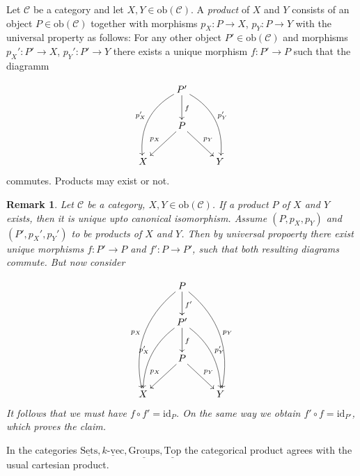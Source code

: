 \documentclass[11pt]{book}
\numberwithin{dummy}{section}
\newtheorem{remark}[theorem]{Remark}
\theoremstyle{nonumberbreak}
\newenvironment{defin}[1][]{\ifthenelse{\equal{#1}{}}{\definition}{\definition[#1]}\rm}{\enddefinition}
\newenvironment{pr}[1][]{\ifthenelse{\equal{#1}{}}{\proof}{\proof[#1]}\rm}{\endproof}
\newenvironment{ex}[1][]{\ifthenelse{\equal{#1}{}}{\example}{\example[#1]}\rm}{\endexample}
\newcommand{\sets}{\underline{\mathrm{Sets}}}
\newcommand{\kvec}{\underline{k\textrm{-}\mathrm{vec}}}
\newcommand{\grp}{\underline{\mathrm{Groups}}}
\newcommand{\topsp}{\underline{\mathrm{Top}}}
\newcommand{\C}{\mathcal{C}}
\newcommand{\obc}{\mathrm{ob}(\mathcal{C})}
\newcommand{\la}{\longrightarrow}
\newcommand{\id}{\mathrm{id}}
\begin{document}
\begin{spacing}{1.4}
\begin{defin}    %

Let $\C$ be a category and let $X,Y \in \obc$. A \textit{product} of $X$ and $Y$ consists of an object $P \in \obc$ together with morphisms $p_X: P \la X$, $p_Y: P \la Y$ with the universal property as follows: For any other object $P' \in \obc$ and morphisms $p_X': P' \la X$, $p_Y': P' \la Y$ there exists a unique morphism $f: P' \la P$ such that the diagramm

$$
\begin{xy}
\xymatrix{
& P' \ar[d]^{f} \ar@/_{16.0pt}/[ldd]_{p_X'} \ar@/^{16pt}/[rdd]^{p_Y'} & \\ & P \ar[ld]_{p_X} \ar[rd]^{p_Y} & \\ X && Y
}
\end{xy}
$$
commutes. Products may exist or not.

\begin{remark}
Let $\C$ be a category, $X,Y \in \obc$. If a product $P$ of $X$ and $Y$ exists, then it is unique upto canonical isomorphism.
\begin{pr}
Assume $(P,p_X, p_Y)$ and $(P', p_X', p_Y')$ to be products of $X$ and $Y$. Then by universal propoerty there exist unique morphisms $f: P' \la P$ and $f': P \la P'$, such that both resulting diagrams commute. But now consider

$$
\begin{xy}
\xymatrix{
& P \ar[d]^{f'} \ar@/_{20.0pt}/[lddd]_{p_X} \ar@/^{20pt}/[rddd]^{p_Y} & \\ & P' \ar[d]^{f} \ar@/_{12.0pt}/[ldd]_{p_X'} \ar@/^{12pt}/[rdd]^{p_Y'} & \\ & P \ar[ld]_{p_X} \ar[rd]^{p_Y} & \\ X && Y
}
\end{xy}
$$
It follows that we must have $f \circ f' = \id_P$. On the same way we obtain $f' \circ f = \id_{P'}$, which proves the claim.

\end{pr}

\end{remark}

\end{defin}


\begin{ex}
In the categories $\sets, \kvec, \grp, \topsp$ the categorical product agrees with the usual cartesian product.
\end{ex}


\end{spacing}
\end{document}
